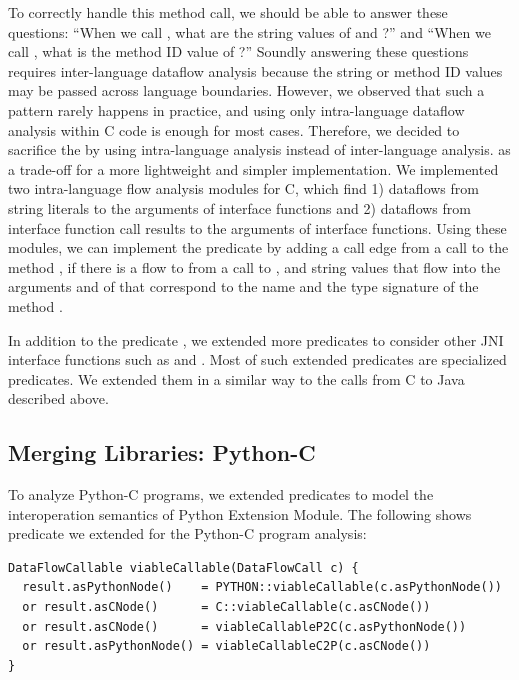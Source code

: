 To correctly handle this method call, we should be able to answer these
questions: ``When we call , what are the string values of
 and ?'' and ``When we call ,
what is the method ID value of ?'' Soundly answering these questions
requires inter-language dataflow analysis because the string or method ID
values may be passed across language boundaries.  However, we observed that
such a pattern rarely happens in practice, and using only intra-language
dataflow analysis within C code is enough for most cases.  Therefore, we
decided to sacrifice the  by using intra-language analysis instead of
inter-language analysis.
as a trade-off for a more lightweight and simpler
implementation.  We implemented two intra-language flow analysis modules for C,
which find 1) dataflows from string literals to the arguments of interface
functions and 2) dataflows from interface function call results to the
arguments of interface functions.  Using these modules, we can implement the
predicate  by adding a call edge from a
 call to the method , if there is a flow to
 from a call to , and string values that flow
into the arguments  and  of  that
correspond to the name and the type signature of the method .

In addition to the predicate , we extended more
predicates to consider other JNI interface functions such as 
and .  Most of such extended predicates are specialized
 predicates.  We extended them in a similar way to the calls from
C to Java described above.

\subsection{Merging Libraries: Python-C}\label{sec:merging2}
To analyze Python-C programs, we extended predicates to model the
interoperation semantics of Python Extension Module.  The following shows
 predicate we extended for the Python-C program
analysis:

\begin{lstlisting}[style=codeql,xleftmargin=-.5em,numbers=none]
DataFlowCallable viableCallable(DataFlowCall c) {
  result.asPythonNode()    = PYTHON::viableCallable(c.asPythonNode())
  or result.asCNode()      = C::viableCallable(c.asCNode())
  or result.asCNode()      = viableCallableP2C(c.asPythonNode())
  or result.asPythonNode() = viableCallableC2P(c.asCNode())
}
\end{lstlisting}


